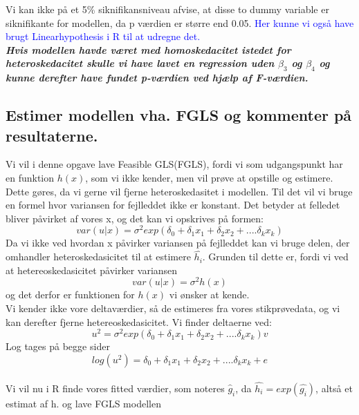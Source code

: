 \documentclass[
  10pt,
]{article}
\begin{document}
Vi kan ikke på et 5\% siknifikansniveau afvise, at disse to dummy
variable er siknifikante for modellen, da p værdien er større end 0.05.
\textcolor{blue}{Her kunne vi også have brugt Linearhypothesis i R til at udregne det.}\\
\textbf{\textit{Hvis modellen havde været med homoskedacitet istedet for heteroskedacitet skulle vi have lavet en regression uden $\beta_3$ og $\beta_4$ og kunne derefter have fundet p-værdien ved hjælp af F-værdien. }}
\newpage

\hypertarget{estimer-modellen-vha.-fgls-og-kommenter-puxe5-resultaterne.}{%
\subsection{Estimer modellen vha. FGLS og kommenter på
resultaterne.}\label{estimer-modellen-vha.-fgls-og-kommenter-puxe5-resultaterne.}}

\leavevmode

Vi vil i denne opgave lave Feasible GLS(FGLS), fordi vi som udgangspunkt
har en funktion \(h(x)\), som vi ikke kender, men vil prøve at opstille
og estimere. Dette gøres, da vi gerne vil fjerne heteroskedasitet i
modellen. Til det vil vi bruge en formel hvor variansen for fejlleddet
ikke er konstant. Det betyder at felledet bliver påvirket af vores x, og
det kan vi opskrives på formen:
\[ var(u|x)=\sigma^2exp(\delta_0+\delta_1x_1+\delta_2x_2+....\delta_kx_k) \]
Da vi ikke ved hvordan x påvirker variansen på fejlleddet kan vi bruge
delen, der omhandler heteroskedasicitet til at estimere \(\hat{h_i}\).
Grunden til dette er, fordi vi ved at hetereoskedasicitet påvirker
variansen \[ var(u|x)=\sigma^2h(x)\] og det derfor er funktionen for
\(h(x)\) vi ønsker at kende.\\

Vi kender ikke vore deltaværdier, så de estimeres fra vores
stikprøvedata, og vi kan derefter fjerne hetereoskedasicitet. Vi finder
deltaerne ved:
\[ u^2=\sigma^2exp(\delta_0+\delta_1x_1+\delta_2x_2+....\delta_kx_k)v\]
Log tages på begge sider
\[ log(u^2)=\delta_0+\delta_1x_1+\delta_2x_2+....\delta_kx_k + e\]\\
Vi vil nu i R finde vores fitted værdier, som noteres \(\hat{g}_i\), da
\(\hat{h_i} = exp(\hat{g_i})\), altså et estimat af h. og lave FGLS
modellen \newpage
\end{document}
